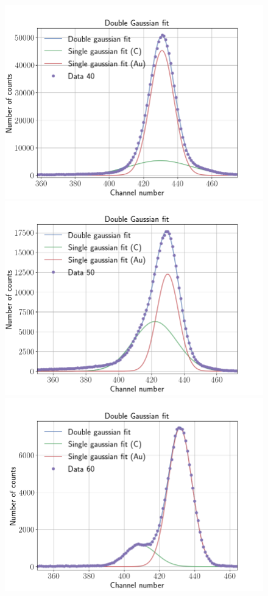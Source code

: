 \begin{figure}[H]
\centering
\includegraphics[width=0.99\columnwidth]{Data_40}
\includegraphics[width=0.99\columnwidth]{Data_50}
\includegraphics[width=0.99\columnwidth]{Data_60}

\end{figure}
